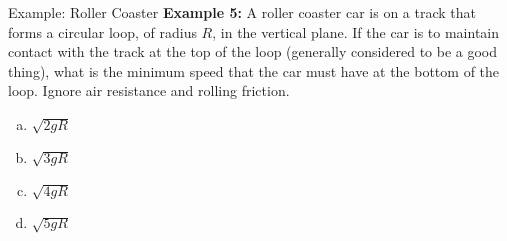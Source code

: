 \documentclass[12pt,compress,aspectratio=169]{beamer}
\begin{document}
%



\begin{frame}{Example: Roller Coaster}
  \textbf{Example 5:} A roller coaster car is on a track that forms a circular
  loop, of radius $R$, in the vertical plane. If the car is to maintain contact
  with the track at the top of the loop (generally considered to be a good
  thing), what is the minimum speed that the car must have at the bottom of the
  loop. Ignore air resistance and rolling friction.
  \begin{enumerate}[(a)]
  \item $\sqrt{2gR}$
  \item $\sqrt{3gR}$
  \item $\sqrt{4gR}$
  \item $\sqrt{5gR}$
  \end{enumerate}
\end{frame}



\end{document}
